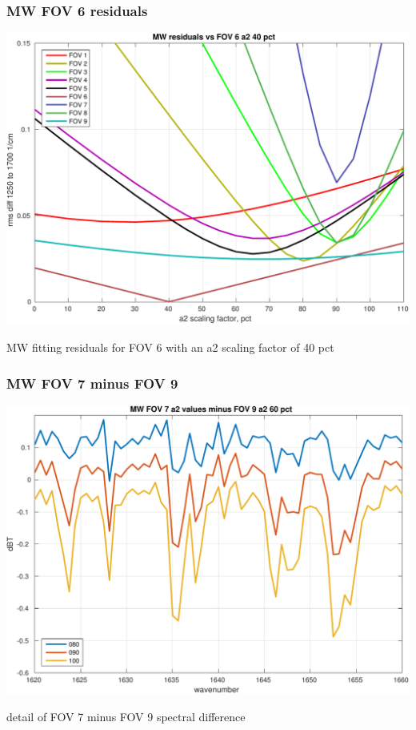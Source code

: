 \documentclass[11pt]{beamer}
\begin{document}
\begin{frame}
\frametitle{MW FOV 6 residuals}
\begin{center}
  \includegraphics[scale=0.5]{figures/MW_resids_FOV_6_a2_40.pdf}
\end{center}
\begin{center}
  MW fitting residuals for FOV 6 with an a2 scaling factor of 40 pct
\end{center}
\end{frame}
\begin{frame}
\frametitle{MW FOV 7 minus FOV 9}
\begin{center}
  \includegraphics[scale=0.5]{figures/MW_FOV_7_minus_9_a2_60.pdf}
\end{center}  
\begin{center}
  detail of FOV 7 minus FOV 9 spectral difference
\end{center}
\end{frame}
\end{document}
